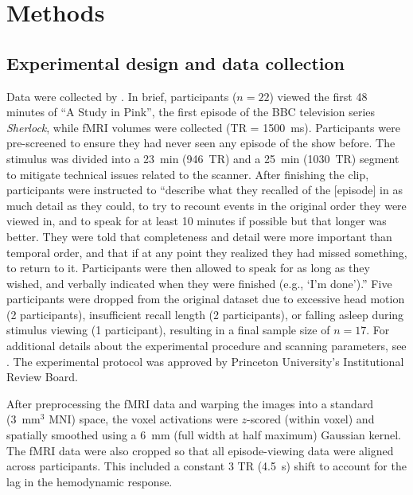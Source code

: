 \documentclass{article}
\begin{document}
\section*{Methods}
\label{sec:methods}

\subsection*{Experimental design and data collection}
Data were collected by \cite{ChenEtal17}.  In brief, participants ($n=22$) viewed the first 48 minutes of ``A Study in Pink'', the first episode of the BBC television series \textit{Sherlock}, while fMRI volumes were collected (TR = 1500~ms).  Participants were pre-screened to ensure they had never seen any episode of the show before.  The stimulus was divided into a 23~min (946~TR) and a 25~min (1030~TR) segment to mitigate technical issues related to the scanner.  After finishing the clip, participants were instructed to \citep[quoting from][]{ChenEtal17} ``describe what they recalled of the [episode] in as much detail as they could, to try to recount events in the original order they were viewed in, and to speak for at least 10 minutes if possible but that longer was better. They were told that completeness and detail were more important than temporal order, and that if at any point they realized they had missed something, to return to it. Participants were then allowed to speak for as long as they wished, and verbally indicated when they were finished (e.g., `I’m done').''  Five participants were dropped from the original dataset due to excessive head motion (2 participants), insufficient recall length (2 participants), or falling asleep during stimulus viewing (1 participant), resulting in a final sample size of $n=17$.  For additional details about the experimental procedure and scanning parameters, see \cite{ChenEtal17}.  The experimental protocol was approved by Princeton University's Institutional Review Board.

After preprocessing the fMRI data and warping the images into a standard (3~mm$^3$ MNI) space, the voxel activations were $z$-scored (within voxel) and spatially smoothed using a 6~mm (full width at half maximum) Gaussian kernel.  The fMRI data were also cropped so that all episode-viewing data were aligned across participants.  This included a constant 3 TR (4.5~s) shift to account for the lag in the hemodynamic response.  \citep[All of these preprocessing steps followed][where additional details may be found.]{ChenEtal17}
\end{document}
